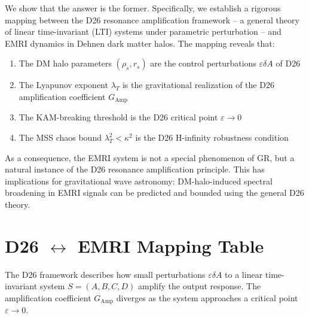 \documentclass[12pt]{article}
\begin{document}
We show that the answer is the former. Specifically, we establish a rigorous mapping between the D26 resonance amplification framework -- a general theory of linear time-invariant (LTI) systems under parametric perturbation -- and EMRI dynamics in Dehnen dark matter halos. The mapping reveals that:

\begin{enumerate}
\item The DM halo parameters $(\rho_s, r_s)$ are the control perturbations $\varepsilon\delta A$ of D26
\item The Lyapunov exponent $\lambda_T$ is the gravitational realization of the D26 amplification coefficient $G_{\text{Amp}}$
\item The KAM-breaking threshold is the D26 critical point $\varepsilon \to 0$
\item The MSS chaos bound $\lambda_T^2 < \kappa^2$ is the D26 H-infinity robustness condition
\end{enumerate}

As a consequence, the EMRI system is not a special phenomenon of GR, but a natural instance of the D26 resonance amplification principle. This has implications for gravitational wave astronomy: DM-halo-induced spectral broadening in EMRI signals can be predicted and bounded using the general D26 theory.

\section{D26 $\leftrightarrow$ EMRI Mapping Table}

The D26 framework describes how small perturbations $\varepsilon\delta A$ to a linear time-invariant system $S = (A, B, C, D)$ amplify the output response. The amplification coefficient $G_{\text{Amp}}$ diverges as the system approaches a critical point $\varepsilon \to 0$.
\end{document}
